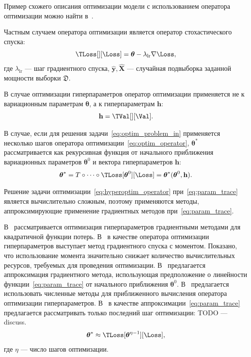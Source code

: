 Пример схожего описания оптимизации модели с использованием оператора оптимизации можно найти в~\cite{early}.

Частным случаем оператора оптимизации является оператор стохастического спуска:
\begin{equation}
\label{eq:sgd_operator}
    \TLoss[][\Loss]  = \boldsymbol{\theta} - \lambda_{\text{lr}} \nabla \Loss,
\end{equation}
где $\lambda_{\text{lr}}$ --- шаг градиентного спуска, $\hat{\mathbf{y}}, \hat{\mathbf{X}}$ --- случайная подвыборка заданной мощности выборки $\mathfrak{D}$.

В случае оптимизации гиперпараметров оператор оптимизации применяется не к вариационным параметрам $\boldsymbol{\theta}$, а к гиперпараметрам $\mathbf{h}$:
\begin{equation}
\label{eq:hyperoptim_operator}
    \h = \TVal[][\Val].
\end{equation}

В случае, если для решения задачи~\eqref{eq:optim_problem_in} применяется несколько шагов оператора оптимизации~\eqref{eq:optim_operator},
$\boldsymbol{\theta}^{*}$ рассматривается как рекурсивная функция от начального приближения вариационных параметров $\boldsymbol{\theta}^{0}$ и вектора гиперпараметров $\mathbf{h}$:
\begin{equation}
\label{eq:param_trace}
    \boldsymbol{\theta}^{*} = T \circ \dots \circ \TLoss[\teta^{0}][\Loss] = \boldsymbol{\theta}^{*}(\boldsymbol{\theta}^{0}, \mathbf{h}).
\end{equation}

Решение задачи оптимизации~\eqref{eq:hyperoptim_operator} при~\eqref{eq:param_trace} является вычислительно сложным, поэтому применяются методы, аппроксимирующие применение градиентных методов при~\eqref{eq:param_trace}.

В~\cite{hyper_bengio} рассматривается оптимизация гиперпараметров градиентными методами для квадратичной функции потерь. В~\cite{hyper} в качестве оператора оптимизации гиперпараметров выступает метод градиентного спуска с моментом. Показано, что использование момента значительно снижает количество вычислительных ресурсов, требуемых для проведения оптимизации. В~\cite{hyper_mad} предлагается аппроксимация градиентного метода, использующая предположение о линейности функции~\eqref{eq:param_trace} от начального приближения $\boldsymbol{\theta}^0$. В~\cite{hyper_hoag} предлагается использовать численные методы для приближенного вычисления оператора оптимизации гиперпараметров. В~\cite{greed_hyper} в качестве аппроксимации~\eqref{eq:param_trace} предлагается рассматривать только последний шаг оптимизации:
TODO --- discuss.
\[
    \boldsymbol{\theta}^{*} \approx \TLoss[\teta^{\eta-1}][\Loss],
\]
где $\eta$ --- число шагов оптимизации.



